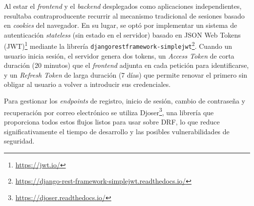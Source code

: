 Al estar el \textit{frontend} y el \textit{backend} desplegados como aplicaciones independientes, resultaba contraproducente recurrir al mecanismo tradicional de sesiones basado en \textit{cookies} del navegador. En su lugar, se optó por implementar un sistema de autenticación \textit{stateless} (sin estado en el servidor) basado en JSON Web Tokens (JWT)\footnote{\url{https://jwt.io/}} mediante la librería \texttt{djangorestframework-simplejwt}\footnote{\url{https://django-rest-framework-simplejwt.readthedocs.io/}}. Cuando un usuario inicia sesión, el servidor genera dos tokens, un \textit{Access Token} de corta duración (20 minutos) que el \textit{frontend} adjunta en cada petición para identificarse, y un \textit{Refresh Token} de larga duración (7 días) que permite renovar el primero sin obligar al usuario a volver a introducir sus credenciales.

Para gestionar los \textit{endpoints} de registro, inicio de sesión, cambio de contraseña y recuperación por correo electrónico se utiliza Djoser\footnote{\url{https://djoser.readthedocs.io/}}, una librería que proporciona todos estos flujos listos para usar sobre DRF, lo que reduce significativamente el tiempo de desarrollo y las posibles vulnerabilidades de seguridad.
